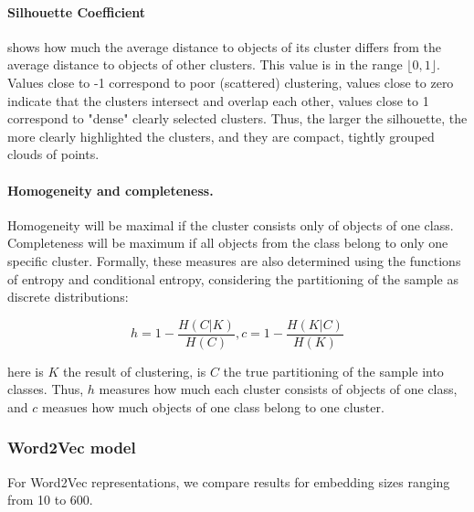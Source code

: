\documentclass[11pt]{article}
\begin{document}
\paragraph{Silhouette Coefficient} shows how much the average distance to objects of its cluster differs from the average distance to objects of other clusters. This value is in the range $\lfloor 0, 1\rfloor$. Values close to -1 correspond to poor (scattered) clustering, values close to zero indicate that the clusters intersect and overlap each other, values close to 1 correspond to "dense" clearly selected clusters. Thus, the larger the silhouette, the more clearly highlighted the clusters, and they are compact, tightly grouped clouds of points.

\paragraph{Homogeneity and completeness.} Homogeneity will be maximal if the cluster consists only of objects of one class. Completeness will be maximum if all objects from the class belong to only one specific cluster.
Formally, these measures are also determined using the functions of entropy and conditional entropy, considering the partitioning of the sample as discrete distributions:

\begin{equation}
h = 1 - \frac{H(C|K)}{H(C)}, c = 1 - \frac{H(K|C)}{H(K)}
\end{equation}

here is $K$ the result of clustering, is $C$ the true partitioning of the sample into classes. Thus, $h$ measures how much each cluster consists of objects of one class, and $c$ measues how much objects of one class belong to one cluster.

\subsubsection{Word2Vec model}

For Word2Vec representations, we compare results for 
embedding sizes ranging from 10 to 600.
\end{document}

